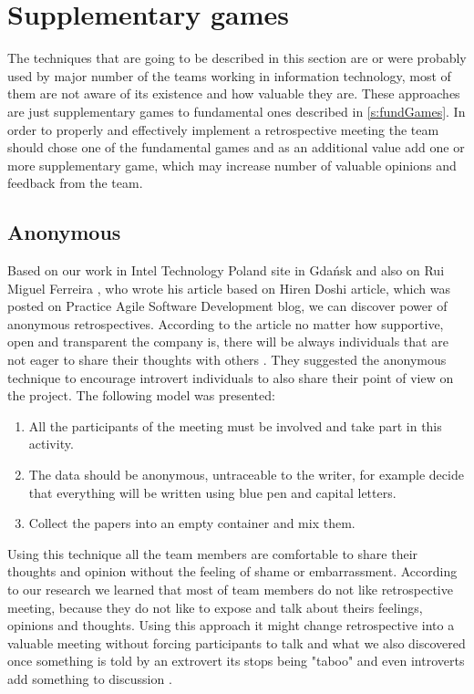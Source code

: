 \section{Supplementary games}
The techniques that are going to be described in this section are or were probably used by major number of the teams working in information technology, most of them are not aware of its existence and how valuable they are. These approaches are just supplementary games to fundamental ones described in \autoref{s:fundGames}. In order to properly and effectively implement a retrospective meeting the team should chose one of the fundamental games and as an additional value add one or more supplementary game, which may increase number of valuable opinions and feedback from the team. 
\subsection{Anonymous}
\label{subch:anon}

Based on our work in Intel Technology Poland site in Gdańsk and also on Rui Miguel Ferreira \cite{anonymousRetro}, who wrote his article based on Hiren Doshi article, which was posted on Practice Agile Software Development blog, we can discover power of anonymous retrospectives. According to the article \cite{anonymousRetro} no matter how supportive, open and transparent the company is, there will be always individuals that are not eager to share their thoughts with others \cite{dosanddonts}. They suggested the anonymous technique to encourage introvert individuals to also share their point of view on the project. The following model was presented:
\begin{enumerate}
    \item All the participants of the meeting must be involved and take part in this activity.
    \item The data should be anonymous, untraceable to the writer, for example decide that everything will be written using blue pen and capital letters.
    \item Collect the papers into an empty container and mix them.
\end{enumerate}

Using this technique all the team members are comfortable to share their thoughts and opinion without the feeling of shame or embarrassment. According to our research we learned that most of team members do not like retrospective meeting, because they do not like to expose and talk about theirs feelings, opinions and thoughts. Using this approach it might change retrospective into a valuable meeting without forcing participants to talk and what we also discovered once something is told by an extrovert its stops being "taboo" and even introverts add something to discussion \cite{dosanddonts}.

